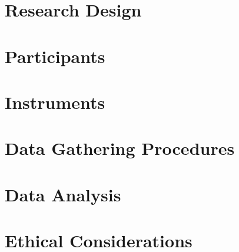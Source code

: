 \documentclass[12pt]{report}
\begin{document}
\section{Research Design}

\section{Participants}

\section{Instruments}

\section{Data Gathering Procedures}

\section{Data Analysis}

\section{Ethical Considerations}

\printbibliography[
    title = {REFERENCES},
    heading = bibintoc
]
\end{document}
